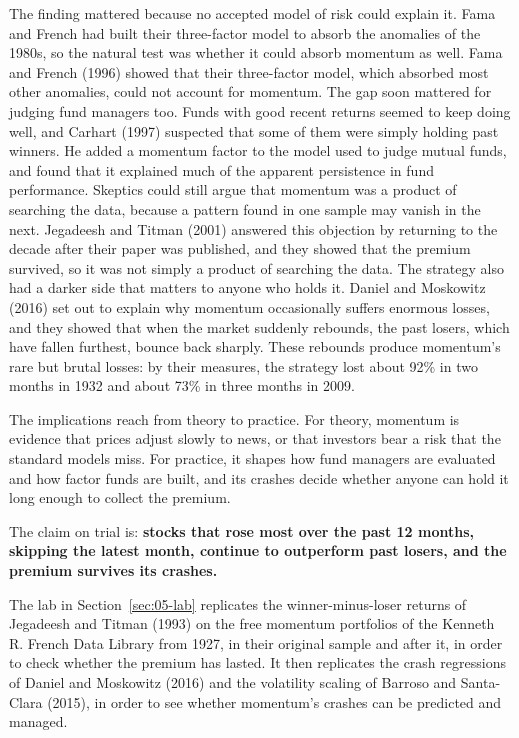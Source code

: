 The finding mattered because no accepted model of risk could explain it. Fama and French had built their three-factor model to absorb the anomalies of the 1980s, so the natural test was whether it could absorb momentum as well. Fama and French (1996) showed that their three-factor model, which absorbed most other anomalies, could not account for momentum. The gap soon mattered for judging fund managers too. Funds with good recent returns seemed to keep doing well, and Carhart (1997) suspected that some of them were simply holding past winners. He added a momentum factor to the model used to judge mutual funds, and found that it explained much of the apparent persistence in fund performance. Skeptics could still argue that momentum was a product of searching the data, because a pattern found in one sample may vanish in the next. Jegadeesh and Titman (2001) answered this objection by returning to the decade after their paper was published, and they showed that the premium survived, so it was not simply a product of searching the data. The strategy also had a darker side that matters to anyone who holds it. Daniel and Moskowitz (2016) set out to explain why momentum occasionally suffers enormous losses, and they showed that when the market suddenly rebounds, the past losers, which have fallen furthest, bounce back sharply. These rebounds produce momentum's rare but brutal losses: by their measures, the strategy lost about 92\% in two months in 1932 and about 73\% in three months in 2009.

The implications reach from theory to practice. For theory, momentum is evidence that prices adjust slowly to news, or that investors bear a risk that the standard models miss. For practice, it shapes how fund managers are evaluated and how factor funds are built, and its crashes decide whether anyone can hold it long enough to collect the premium. 

The claim on trial is: \textbf{stocks that rose most over the past 12 months, skipping the latest month, continue to outperform past losers, and the premium survives its crashes.}

The lab in Section~\ref{sec:05-lab} replicates the winner-minus-loser returns of Jegadeesh and Titman (1993) on the free momentum portfolios of the Kenneth R. French Data Library from 1927, in their original sample and after it, in order to check whether the premium has lasted. It then replicates the crash regressions of Daniel and Moskowitz (2016) and the volatility scaling of Barroso and Santa-Clara (2015), in order to see whether momentum's crashes can be predicted and managed.

